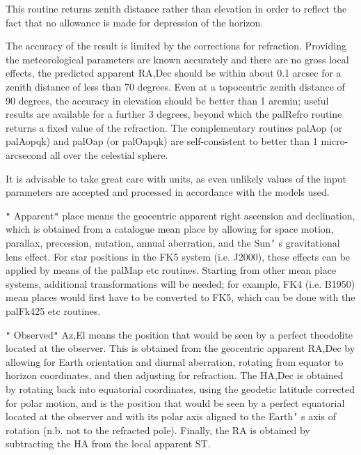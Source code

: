 \documentclass[twoside,11pt,nolof]{starlink}
\begin{document}
{{{         \sstitem
          This routine returns zenith distance rather than elevation
           in order to reflect the fact that no allowance is made for
           depression of the horizon.

         \sstitem
          The accuracy of the result is limited by the corrections for
           refraction.  Providing the meteorological parameters are
           known accurately and there are no gross local effects, the
           predicted apparent RA,Dec should be within about 0.1 arcsec
           for a zenith distance of less than 70 degrees.  Even at a
           topocentric zenith distance of 90 degrees, the accuracy in
           elevation should be better than 1 arcmin;  useful results
           are available for a further 3 degrees, beyond which the
           palRefro routine returns a fixed value of the refraction.
           The complementary routines palAop (or palAopqk) and palOap
           (or palOapqk) are self-consistent to better than 1 micro-
           arcsecond all over the celestial sphere.

         \sstitem
          It is advisable to take great care with units, as even
           unlikely values of the input parameters are accepted and
           processed in accordance with the models used.

         \sstitem
          \texttt{"} Apparent\texttt{"}  place means the geocentric apparent right ascension
           and declination, which is obtained from a catalogue mean place
           by allowing for space motion, parallax, precession, nutation,
           annual aberration, and the Sun\texttt{'} s gravitational lens effect.  For
           star positions in the FK5 system (i.e. J2000), these effects can
           be applied by means of the palMap etc routines.  Starting from
           other mean place systems, additional transformations will be
           needed;  for example, FK4 (i.e. B1950) mean places would first
           have to be converted to FK5, which can be done with the
           palFk425 etc routines.

         \sstitem
          \texttt{"} Observed\texttt{"}  Az,El means the position that would be seen by a
           perfect theodolite located at the observer.  This is obtained
           from the geocentric apparent RA,Dec by allowing for Earth
           orientation and diurnal aberration, rotating from equator
           to horizon coordinates, and then adjusting for refraction.
           The HA,Dec is obtained by rotating back into equatorial
           coordinates, using the geodetic latitude corrected for polar
           motion, and is the position that would be seen by a perfect
           equatorial located at the observer and with its polar axis
           aligned to the Earth\texttt{'} s axis of rotation (n.b. not to the
           refracted pole).  Finally, the RA is obtained by subtracting
           the HA from the local apparent ST.

}}}
\end{document}
